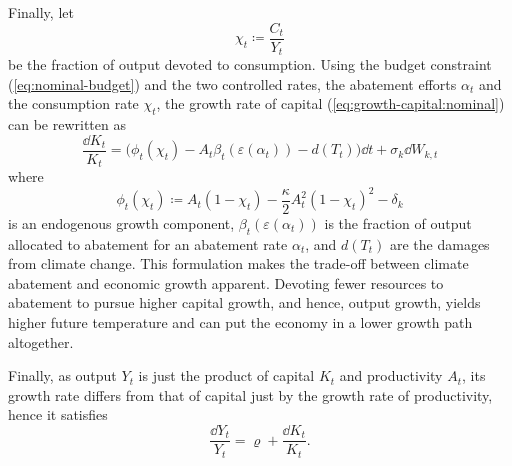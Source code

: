 \documentclass[../../main.tex]{subfiles}
\begin{document}
Finally, let \begin{equation}
    \chi_t \coloneqq \frac{C_t}{Y_t}
\end{equation} be the fraction of output devoted to consumption. Using the budget constraint (\ref{eq:nominal-budget}) and the two controlled rates, the abatement efforts $\alpha_t$ and the consumption rate $\chi_t$, the growth rate of capital (\ref{eq:growth-capital:nominal}) can be rewritten as \begin{equation}
    \frac{\dd{K_t}}{K_t} = \Big(\phi_t(\chi_t) - A_t \beta_t(\varepsilon(\alpha_t)) - d(T_t) \Big) \dd{t} + \sigma_k \dd{W}_{k, t}
\end{equation} where \begin{equation}
    \phi_t(\chi_t) \coloneqq A_t (1 - \chi_t) - \frac{\kappa}{2} A_t^2 (1 - \chi_t)^2 - \delta_k
\end{equation} is an endogenous growth component, $\beta_t(\varepsilon(\alpha_t))$ is the fraction of output allocated to abatement for an abatement rate  $\alpha_t$, and $d(T_t)$ are the damages from climate change. This formulation makes the trade-off between climate abatement and economic growth apparent. Devoting fewer resources to abatement to pursue higher capital growth, and hence, output growth, yields higher future temperature and can put the economy in a lower growth path altogether.

Finally, as output $Y_t$ is just the product of capital $K_t$ and productivity $A_t$, its growth rate differs from that of capital just by the growth rate of productivity, hence it satisfies \begin{equation}
    \frac{\dd{Y}_t}{Y_t} = \varrho + \frac{\dd{K}_t}{K_t}. 
\end{equation}
\end{document}
